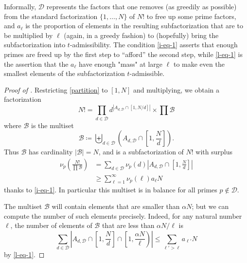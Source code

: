 \documentclass[10pt,a4paper,reqno]{amsart}
\numberwithin{equation}{section}
\theoremstyle{plain}
\theoremstyle{definition}
\newcommand\tuple{{\mathcal B}}
\begin{document}
  Informally, ${\mathcal D}$ represents the factors that one removes (as greedily as possible) from the standard factorization $\{1,\dots,N\}$ of $N!$ to free up some prime factors, and $a_\ell$ is the proportion of elements in the resulting subfactorization that are to be multiplied by $\ell$ (again, in a greedy fashion) to (hopefully) bring the subfactorization into $t$-admissibility.  The condition \eqref{i-eq-1} asserts that enough primes are freed up by the first step to ``afford'' the second step, while \eqref{l-eq-1} is the assertion that the $a_\ell$ have enough "mass" at large $\ell$ to make even the smallest elements of the subfactorization $t$-admissible.

  \begin{proof}[Proof of ]  Restricting \eqref{partition} to $[1,N]$ and multiplying, we obtain a factorization
  $$ N! = \prod_{d \in {\mathcal D}} d^{|A_{d,{\mathcal D}} \cap [1,N/d]|} \times \prod \tuple$$
  where $\tuple$ is the multiset
  $$ \tuple \coloneqq \biguplus_{d \in {\mathcal D}} \left(A_{d,{\mathcal D}} \cap \left[1,\frac{N}{d}\right]\right).$$
  Thus $\tuple$ has cardinality $|\tuple| = N$, and is a subfactorization of $N!$ with surplus
  \begin{equation}\label{p-surplus-1}
  \begin{split}
   \nu_p\left( \frac{N!}{\prod \tuple} \right) &= \sum_{d \in {\mathcal D}} \nu_p(d) \left|A_{d,{\mathcal D}} \cap \left[1,\frac{N}{d}\right]\right| \\
   &\geq      \sum_{\ell=1}^\infty \nu_p(\ell) a_\ell N
  \end{split}
  \end{equation}
  thanks to \eqref{i-eq-1}.  In particular this multiset is in balance for all primes $p \not \in {\mathcal D}$. 
  
  The multiset $\tuple$ will contain elements that are smaller than $\alpha N$; but we can compute the number of such elements  precisely.  Indeed, for any natural number $\ell$, the number of elements of $\tuple$ that are less than $\alpha N/\ell$ is
  \begin{equation}\label{N-sum-1}
    \sum_{d \in {\mathcal D}} \left|A_{d,{\mathcal D}} \cap \left[1,\frac{N}{d}\right] \cap \left[1,\frac{\alpha N}{\ell}\right)\right| 
    \leq  \sum_{\ell' > \ell} a_{\ell'} N
  \end{equation}
  by \eqref{l-eq-1}.
    

\end{proof}
\end{document}
